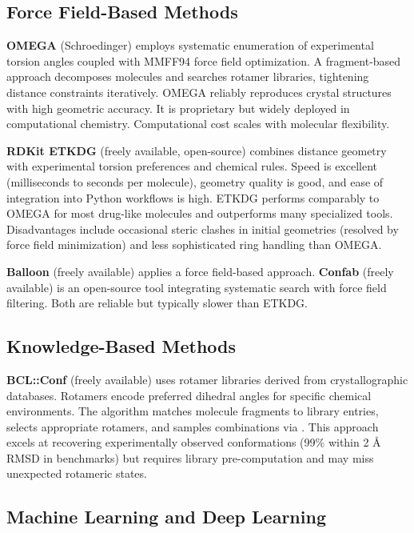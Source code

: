 \documentclass[12pt]{article}
\begin{document}
\subsection{Force Field-Based Methods}

\textbf{OMEGA} (Schroedinger) employs systematic enumeration of experimental torsion angles coupled with MMFF94 force field optimization. A fragment-based approach decomposes molecules and searches rotamer libraries, tightening distance constraints iteratively. OMEGA reliably reproduces crystal structures with high geometric accuracy. It is proprietary but widely deployed in computational chemistry. Computational cost scales with molecular flexibility.

\textbf{RDKit ETKDG} (freely available, open-source) combines distance geometry with experimental torsion preferences and chemical rules. Speed is excellent (milliseconds to seconds per molecule), geometry quality is good, and ease of integration into Python workflows is high. ETKDG performs comparably to OMEGA for most drug-like molecules and outperforms many specialized tools. Disadvantages include occasional steric clashes in initial geometries (resolved by force field minimization) and less sophisticated ring handling than OMEGA.

\textbf{Balloon} (freely available) applies a force field-based approach. \textbf{Confab} (freely available) is an open-source tool integrating systematic search with force field filtering. Both are reliable but typically slower than ETKDG.

\subsection{Knowledge-Based Methods}

\textbf{BCL::Conf} (freely available) uses rotamer libraries derived from crystallographic databases. Rotamers encode preferred dihedral angles for specific chemical environments. The algorithm matches molecule fragments to library entries, selects appropriate rotamers, and samples combinations via \MC. This approach excels at recovering experimentally observed conformations (99\% within 2 Å RMSD in benchmarks) but requires library pre-computation and may miss unexpected rotameric states.

\subsection{Machine Learning and Deep Learning}
\end{document}
